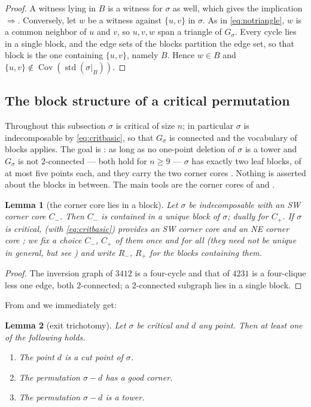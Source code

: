 \documentclass[12pt]{article}
\def\xspace{ }%
\newtheorem{lemma}[lemma]{Lemma}
\theoremstyle{definition}
\newcommand{\good}{good\xspace}
\newcommand{\std}{\operatorname{std}}
\newcommand{\Cov}{\operatorname{Cov}}  %
\newcommand{\Wcr}{W\xspace}    %
\newcommand{\Ncr}{N\xspace}    %
\newcommand{\Scr}{S\xspace}    %
\newcommand{\Ecr}{E\xspace}    %
\newcommand{\SWcr}{SW\xspace}  %
\newcommand{\NEcr}{NE\xspace}  %
\newcommand{\core}{corner core\xspace}
\newcommand{\cores}{corner cores\xspace}
\newcommand{\Cm}{C_{-}}
\newcommand{\Cp}{C_{+}}
\newcommand{\Rm}{R_{-}}
\newcommand{\Rp}{R_{+}}
\newcommand{\igr}{G}                      %
\begin{document}
\begin{proof}
A witness lying in $B$ is a witness for $\sigma$ as well, which gives the
implication $\Rightarrow$. Conversely, let $w$ be a witness against
$\{u,v\}$ in $\sigma$. As in \eqref{eq:notriangle}, $w$ is a common
neighbor of $u$ and $v$, so $u,v,w$ span a triangle of $\igr_\sigma$.
Every cycle lies in a single block, and the edge sets of the blocks
partition the edge set, so that block is the one containing $\{u,v\}$,
namely $B$. Hence $w \in B$ and $\{u,v\} \notin
\Cov(\std(\sigma|_B))$.
\end{proof}


\subsection{The block structure of a critical
permutation}\label{ssec:critblocks}

Throughout this subsection $\sigma$ is critical of size $n$; in particular
$\sigma$ is indecomposable by \eqref{eq:critbasic}, so that $\igr_\sigma$
is connected and the vocabulary of blocks applies. The goal is
: as long as no one-point deletion of $\sigma$ is a tower and
$\igr_\sigma$ is not $2$-connected --- both hold for
$n \ge 9$ --- $\sigma$ has exactly two leaf blocks, of at most five
points each, and they carry the two \cores.
Nothing is asserted about the blocks in between. The main tools are the
\cores of  and .


\begin{lemma}[the \core{} lies in a block]\label{lem:core}
Let $\sigma$ be indecomposable with an \SWcr \core{} $\Cm$. Then $\Cm$ is
contained in a unique block of $\sigma$; dually for $\Cp$. If $\sigma$ is critical,  (with \eqref{eq:critbasic}) provides an \SWcr
\core{} and an \NEcr \core; we fix a choice $\Cm$, $\Cp$ of them once and for
all (they need not be unique in general, but see )
and write $\Rm$, $\Rp$ for the blocks containing them.
\end{lemma}

\begin{proof}
The inversion graph of $3412$ is a four-cycle and that of $4231$ is a
four-clique less one edge, both $2$-connected; a $2$-connected subgraph
lies in a single block.
\end{proof}

From  and  we immediately get:
\begin{lemma}[exit trichotomy]\label{lem:exit3}
Let $\sigma$ be critical and $d$ any point. Then at least one of the
following holds.
\begin{enumerate}
\renewcommand{\theenumi}{M\arabic{enumi}}%
\renewcommand{\labelenumi}{(\theenumi)}%
\item\label{M:cut} The point $d$ is a cut point of $\sigma$.
\item\label{M:corner} The permutation $\sigma - d$ has a \good corner.
\item\label{M:tower} The permutation $\sigma - d$ is a tower.
\end{enumerate}
\end{lemma}
\end{document}
